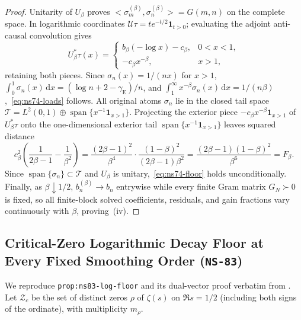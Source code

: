 \documentclass[11pt]{article}
\def\ip#1#2{<#1,#2>}%
\theoremstyle{remark}
\newcommand{\ip}[2]{\left\langle #1,#2\right\rangle}
\newcommand{\dd}{\mathrm d}
\begin{document}
\begin{proof}
Unitarity of $U_\beta$ proves $\ip{\sigma_m^{(\beta)}}{\sigma_n^{(\beta)}} = G(m,n)$ on the complete space. In logarithmic coordinates $\mathcal{U}\tau = t e^{-t/2}\mathbf{1}_{t>0}$; evaluating the adjoint anti-causal convolution gives
\[
  U_\beta^*\tau(x) = \begin{cases} b_\beta(-\log x) - c_\beta, & 0 < x < 1, \\ -c_\beta x^{-\beta}, & x > 1, \end{cases}
\]
retaining both pieces. Since $\sigma_n(x) = 1/(nx)$ for $x > 1$, $\int_0^1 \sigma_n(x)\,\dd x = (\log n + 2 - \gamma_{\mathrm{E}})/n$, and $\int_1^\infty x^{-\beta}\sigma_n(x)\,\dd x = 1/(n\beta)$,~\eqref{eq:ns74-loads} follows. All original atoms $\sigma_n$ lie in the closed tail space $\mathcal{T} = L^2(0,1) \oplus \operatorname{span}\{x^{-1}\mathbf{1}_{x>1}\}$. Projecting the exterior piece $-c_\beta x^{-\beta}\mathbf{1}_{x>1}$ of $U_\beta^*\tau$ onto the one-dimensional exterior tail $\operatorname{span}\{x^{-1}\mathbf{1}_{x>1}\}$ leaves squared distance
\[
  c_\beta^2\left(\frac{1}{2\beta - 1} - \frac{1}{\beta^2}\right) = \frac{(2\beta - 1)^2}{\beta^4}\cdot \frac{(1 - \beta)^2}{(2\beta - 1)\beta^2} = \frac{(2\beta - 1)(1 - \beta)^2}{\beta^6} = F_\beta.
\]
Since $\operatorname{span}\{\sigma_n\} \subset \mathcal{T}$ and $U_\beta$ is unitary,~\eqref{eq:ns74-floor} holds unconditionally. Finally, as $\beta \downarrow 1/2$, $b_n^{(\beta)} \to b_n$ entrywise while every finite Gram matrix $G_N \succ 0$ is fixed, so all finite-block solved coefficients, residuals, and gain fractions vary continuously with $\beta$, proving~(iv).
\end{proof}

\subsection{Critical-Zero Logarithmic Decay Floor at Every Fixed Smoothing Order (\texttt{NS-83})}
We reproduce \texttt{prop:ns83-log-floor} and its dual-vector proof verbatim from . Let $\mathcal{Z}_c$ be the set of distinct zeros $\rho$ of $\zeta(s)$ on $\Re s = 1/2$ (including both signs of the ordinate), with multiplicity $m_\rho$.
\end{document}
